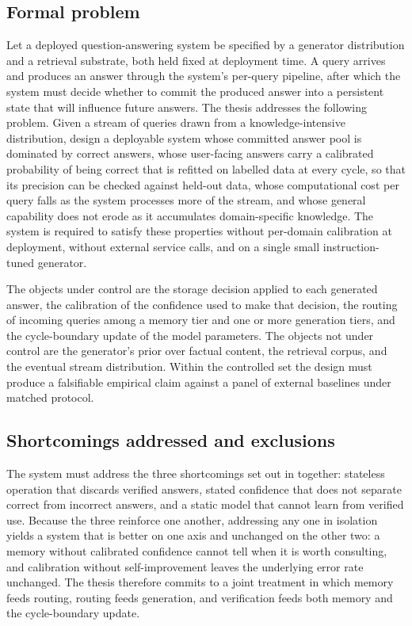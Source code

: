 \subsection{Formal problem}
\label{sec:formal-problem}

Let a deployed question-answering system be specified by a generator distribution and a retrieval substrate, both held fixed at deployment time. A query arrives and produces an answer through the system's per-query pipeline, after which the system must decide whether to commit the produced answer into a persistent state that will influence future answers. The thesis addresses the following problem. Given a stream of queries drawn from a knowledge-intensive distribution, design a deployable system whose committed answer pool is dominated by correct answers, whose user-facing answers carry a calibrated probability of being correct that is refitted on labelled data at every cycle, so that its precision can be checked against held-out data, whose computational cost per query falls as the system processes more of the stream, and whose general capability does not erode as it accumulates domain-specific knowledge. The system is required to satisfy these properties without per-domain calibration at deployment, without external service calls, and on a single small instruction-tuned generator.

The objects under control are the storage decision applied to each generated answer, the calibration of the confidence used to make that decision, the routing of incoming queries among a memory tier and one or more generation tiers, and the cycle-boundary update of the model parameters. The objects not under control are the generator's prior over factual content, the retrieval corpus, and the eventual stream distribution. Within the controlled set the design must produce a falsifiable empirical claim against a panel of external baselines under matched protocol.

\subsection{Shortcomings addressed and exclusions}
\label{sec:three-shortcomings}

The system must address the three shortcomings set out in  together: stateless operation that discards verified answers, stated confidence that does not separate correct from incorrect answers, and a static model that cannot learn from verified use. Because the three reinforce one another, addressing any one in isolation yields a system that is better on one axis and unchanged on the other two: a memory without calibrated confidence cannot tell when it is worth consulting, and calibration without self-improvement leaves the underlying error rate unchanged. The thesis therefore commits to a joint treatment in which memory feeds routing, routing feeds generation, and verification feeds both memory and the cycle-boundary update.

